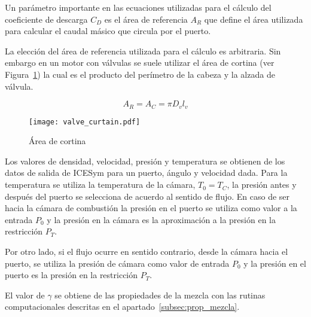 Un parámetro importante en las ecuaciones utilizadas para el cálculo del
coeficiente de descarga $C_{D}$ es el área de referencia $A_{R}$ que define el
área utilizada para calcular el caudal másico que circula por el puerto.
%

La elección del área de referencia utilizada para el cálculo es arbitraria.
%
Sin embargo en un motor con válvulas se suele utilizar el área de cortina (ver
Figura~\ref{fig:area_cortina}) la cual es el producto del perímetro de la
cabeza y la alzada de válvula.

\begin{equation} \label{eq:area_cortina}
  A_R = A_C = \pi D_v l_v
\end{equation}


\begin{figure}[h!]
  \centering
\texttt{[image: valve\_curtain.pdf]}
  \caption{Área de cortina}\label{fig:area_cortina}
\end{figure}

Los valores de densidad, velocidad, presión y temperatura se obtienen de los
datos de salida de ICESym para un puerto, ángulo y velocidad dada.
%
Para la temperatura se utiliza la temperatura de la cámara, $T_0 = T_C$, la
presión antes y después del puerto se selecciona de acuerdo al sentido de
flujo.
%
En caso de ser hacia la cámara de combustión la presión en el puerto se utiliza
como valor a la entrada $P_0$ y la presión en la cámara es la aproximación a la presión en
la restricción $P_T$.
%

Por otro lado, si el flujo ocurre en sentido contrario, desde la cámara hacia el
puerto, se utiliza la presión de cámara como valor de entrada $P_{0}$ y la
presión en el puerto es la presión en la restricción $P_{T}$.

El valor de $\gamma$ se obtiene de las propiedades de la mezcla con las rutinas
computacionales descritas en el apartado~\ref{subsec:prop_mezcla}.
%
%
